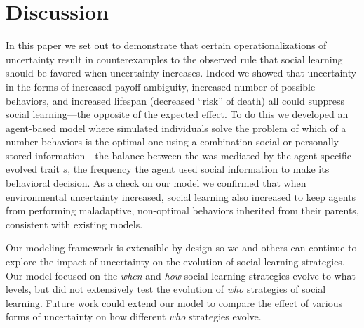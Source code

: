 \documentclass[10pt,letterpaper]{article}
\begin{document}
\section{Discussion}
 
In this paper we set out to demonstrate that certain operationalizations of
uncertainty result in counterexamples to the observed rule that social learning
should be favored when uncertainty increases. Indeed we showed that 
uncertainty in the forms of increased payoff ambiguity, increased number 
of possible behaviors, and increased lifespan (decreased ``risk'' of death)
all could suppress social learning---the opposite of the expected effect. 
To do this we developed an agent-based model where 
simulated individuals solve the problem of which of a number behaviors is
the optimal one using a combination social or personally-stored
information---the balance between the was mediated by the agent-specific 
evolved trait $s$,
the frequency the agent used social information to make its behavioral decision. 
As a check on our model we confirmed that when 
environmental uncertainty increased, social learning also increased to 
keep agents from performing maladaptive, non-optimal behaviors inherited from their 
parents, consistent with existing models.

Our modeling framework is extensible by design so we and others can continue
to explore the impact of uncertainty on the evolution of 
social learning strategies.  Our model focused
on the \emph{when} and \emph{how} social learning strategies evolve to
what levels, but did not extensively test the evolution of \emph{who} 
strategies of social learning.  Future work could extend our model to 
compare the effect of various forms of uncertainty 
on how different \emph{who} strategies evolve.
\end{document}
